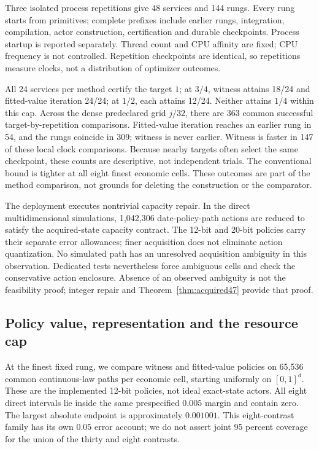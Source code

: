 Three isolated process repetitions give 48 services and 144 rungs. Every rung starts from primitives; complete prefixes include earlier rungs, integration, compilation, actor construction, certification and durable checkpoints. Process startup is reported separately. Thread count and CPU affinity are fixed; CPU frequency is not controlled. Repetition checkpoints are identical, so repetitions measure clocks, not a distribution of optimizer outcomes.


All 24 services per method certify the target $1$; at $3/4$, witness attains 18/24 and fitted-value iteration 24/24; at $1/2$, each attains 12/24. Neither attains $1/4$ within this cap. Across the dense predeclared grid $j/32$, there are 363 common successful target-by-repetition comparisons. Fitted-value iteration reaches an earlier rung in 54, and the rungs coincide in 309; witness is never earlier. Witness is faster in 147 of these local clock comparisons. Because nearby targets often select the same checkpoint, these counts are descriptive, not independent trials. The conventional bound is tighter at all eight finest economic cells. These outcomes are part of the method comparison, not grounds for deleting the construction or the comparator.

The deployment executes nontrivial capacity repair. In the direct multidimensional simulations, 1,042,306 date-policy-path actions are reduced to satisfy the acquired-state capacity contract. The 12-bit and 20-bit policies carry their separate error allowances; finer acquisition does not eliminate action quantization. No simulated path has an unresolved acquisition ambiguity in this observation. Dedicated tests nevertheless force ambiguous cells and check the conservative action enclosure. Absence of an observed ambiguity is not the feasibility proof; integer repair and Theorem~\ref{thm:acquired47} provide that proof.

\subsection{Policy value, representation and the resource cap}
At the finest fixed rung, we compare witness and fitted-value policies on 65,536 common continuous-law paths per economic cell, starting uniformly on $[0,1]^d$. These are the implemented 12-bit policies, not ideal exact-state actors. All eight direct intervals lie inside the same prespecified $0.005$ margin and contain zero. The largest absolute endpoint is approximately $0.001001$. This eight-contrast family has its own $0.05$ error account; we do not assert joint 95 percent coverage for the union of the thirty and eight contrasts.


